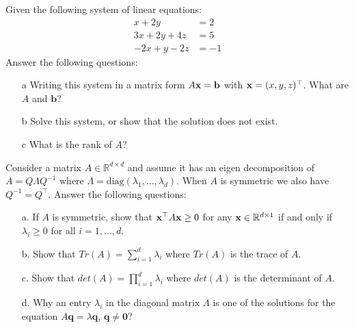 \begin{question}
\label{q:linear_equations}
Given the following system of linear equations:
\begin{equation*}
\begin{aligned}
    x + 2y &= 2 \\
    3x + 2y + 4z &= 5  \\
    -2x + y - 2z &= -1
\end{aligned}
\end{equation*}
Answer the following questions:
\begin{itemize}
    \item[a] Writing this system in a matrix form $A\mathbf{x} = \mathbf{b}$ with $\mathbf{x} = (x, y, z)^\top$. What are $A$ and $\mathbf{b}$?
    \item[b] Solve this system, or show that the solution does not exist.
    \item[c] What is the rank of $A$?
\end{itemize}
\end{question}

\begin{question}
\label{q:eigen_decomp}
Consider a matrix $A \in \mathbb{R}^{d \times d}$ and assume it has an eigen decomposition of $A = Q \Lambda Q^{-1}$ where $\Lambda = \text{diag}(\lambda_1, ..., \lambda_d)$. When $A$ is symmetric we also have $Q^{-1} = Q^\top$. Answer the following questions:
\begin{itemize}
    \item[a.] If $A$ is symmetric, show that $\mathbf{x}^\top A \mathbf{x} \geq 0$ for any $\mathbf{x} \in \mathbb{R}^{d \times 1}$ if and only if $\lambda_i \geq 0$ for all $i = 1,..., d$.
    \item[b.] Show that $Tr(A) = \sum_{i=1}^d \lambda_i$ where $Tr(A)$ is the trace of $A$.
    \item[c.] Show that $det(A) = \prod_{i=1}^d \lambda_i$ where $det(A)$ is the determinant of $A$.
    \item[d.] Why an entry $\lambda_i$ in the diagonal matrix $\Lambda$ is one of the solutions for the equation $A\bm{q} = \lambda \bm{q}$, $\bm{q} \neq \bm{0}$?
\end{itemize}
\end{question}
